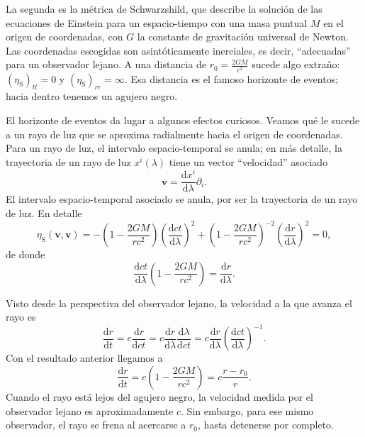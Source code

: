 \begin{example}
    La segunda es la métrica de Schwarzshild, que describe la solución de las ecuaciones de Einstein para un espacio-tiempo con una masa puntual \(M\) en el origen de coordenadas, con \(G\) la constante de gravitación universal de Newton. Las coordenadas escogidas son asintóticamente inerciales, es decir, ``adecuadas'' para un observador lejano. A una distancia de \(r_0 = \frac{2GM}{c^2}\) sucede algo extraño: \((\eta_\text{S})_{tt} = 0\) y \((\eta_\text{S})_{rr} = \infty\). Esa distancia es el famoso horizonte de eventos; hacia dentro tenemos un agujero negro.
    
    El horizonte de eventos da lugar a algunos efectos curiosos. Veamos qué le sucede a un rayo de luz que se aproxima radialmente hacia el origen de coordenadas. Para un rayo de luz, el intervalo espacio-temporal se anula; en más detalle, la trayectoria de un rayo de luz \(x^i(\lambda)\) tiene un vector ``velocidad'' asociado
    \begin{equation*}
        \mathbf{v} = \frac{\mathrm{d}x^i}{\mathrm{d}\lambda} \partial_i.
    \end{equation*}
    El intervalo espacio-temporal asociado  se anula, por ser la trayectoria de un rayo de luz. En detalle 
    \begin{equation*}
        \eta_\text{S}\left(\mathbf{v}, \mathbf{v}\right) = -\left(1-\frac{2GM}{rc^2}\right) \left(\frac{\mathrm{d}ct}{\mathrm{d}\lambda}\right)^2 + \left(1-\frac{2GM}{rc^2}\right)^{-2} \left(\frac{\mathrm{d}r}{\mathrm{d}\lambda}\right)^2 = 0,
    \end{equation*}
    de donde
    \begin{equation*}
        \frac{\mathrm{d}ct}{\mathrm{d}\lambda}\left(1-\frac{2GM}{rc^2}\right) = \frac{\mathrm{d}r}{\mathrm{d}\lambda}.
    \end{equation*}

    Visto desde la perspectiva del observador lejano, la velocidad a la que avanza el rayo es 
    \begin{equation*}
        \frac{\mathrm{d}r}{\mathrm{d}t} = c\frac{\mathrm{d}r}{\mathrm{d}ct} = c\frac{\mathrm{d}r}{\mathrm{d}\lambda} \frac{\mathrm{d}\lambda}{\mathrm{d}ct} = c\frac{\mathrm{d}r}{\mathrm{d}\lambda} \left(\frac{\mathrm{d}ct}{\mathrm{d}\lambda}\right)^{-1}.
    \end{equation*}
    Con el resultado anterior llegamos a
    \begin{equation*}
        \frac{\mathrm{d}r}{\mathrm{d}t} = c \left(1-\frac{2GM}{rc^2}\right) = c\frac{r-r_0}{r}. 
    \end{equation*}
    Cuando el rayo está lejos del agujero negro, la velocidad medida por el observador lejano es aproximadamente \(c\). Sin embargo, para ese mismo observador, el rayo se frena al acercarse a \(r_0\), hasta detenerse por completo.
    

\end{example}
